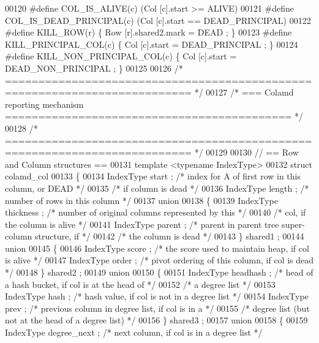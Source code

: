 \begin{DoxyCode}
00120 \textcolor{preprocessor}{#define COL\_IS\_ALIVE(c)     (Col [c].start >= ALIVE)}
00121 \textcolor{preprocessor}{#define COL\_IS\_DEAD\_PRINCIPAL(c)  (Col [c].start == DEAD\_PRINCIPAL)}
00122 \textcolor{preprocessor}{#define KILL\_ROW(r)     \{ Row [r].shared2.mark = DEAD ; \}}
00123 \textcolor{preprocessor}{#define KILL\_PRINCIPAL\_COL(c)   \{ Col [c].start = DEAD\_PRINCIPAL ; \}}
00124 \textcolor{preprocessor}{#define KILL\_NON\_PRINCIPAL\_COL(c) \{ Col [c].start = DEAD\_NON\_PRINCIPAL ; \}}
00125 
00126 \textcolor{comment}{/* ========================================================================== */}
00127 \textcolor{comment}{/* === Colamd reporting mechanism =========================================== */}
00128 \textcolor{comment}{/* ========================================================================== */}
00129 
00130 \textcolor{comment}{// == Row and Column structures ==}
00131 \textcolor{keyword}{template} <\textcolor{keyword}{typename} IndexType>
00132 \textcolor{keyword}{struct }colamd\_col
00133 \{
00134   IndexType start ;   \textcolor{comment}{/* index for A of first row in this column, or DEAD */}
00135   \textcolor{comment}{/* if column is dead */}
00136   IndexType length ;  \textcolor{comment}{/* number of rows in this column */}
00137   \textcolor{keyword}{union}
00138   \{
00139     IndexType thickness ; \textcolor{comment}{/* number of original columns represented by this */}
00140     \textcolor{comment}{/* col, if the column is alive */}
00141     IndexType parent ;  \textcolor{comment}{/* parent in parent tree super-column structure, if */}
00142     \textcolor{comment}{/* the column is dead */}
00143   \} shared1 ;
00144   \textcolor{keyword}{union}
00145   \{
00146     IndexType score ; \textcolor{comment}{/* the score used to maintain heap, if col is alive */}
00147     IndexType order ; \textcolor{comment}{/* pivot ordering of this column, if col is dead */}
00148   \} shared2 ;
00149   \textcolor{keyword}{union}
00150   \{
00151     IndexType headhash ;  \textcolor{comment}{/* head of a hash bucket, if col is at the head of */}
00152     \textcolor{comment}{/* a degree list */}
00153     IndexType hash ;  \textcolor{comment}{/* hash value, if col is not in a degree list */}
00154     IndexType prev ;  \textcolor{comment}{/* previous column in degree list, if col is in a */}
00155     \textcolor{comment}{/* degree list (but not at the head of a degree list) */}
00156   \} shared3 ;
00157   \textcolor{keyword}{union}
00158   \{
00159     IndexType degree\_next ; \textcolor{comment}{/* next column, if col is in a degree list */}

\end{DoxyCode}
